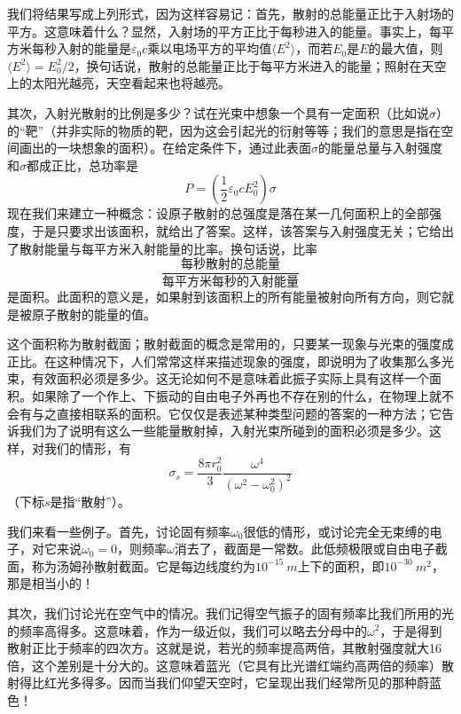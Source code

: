 我们将结果写成上列形式，因为这样容易记：首先，散射的总能量正比于入射场的平方。这意味着什么？显然，入射场的平方正比于每秒进入的能量。事实上，每平方米每秒入射的能量是$\varepsilon_0c$乘以电场平方的平均值$\langle E^2 \rangle$，而若$E_0$是$E$的最大值，则$\langle E^2 \rangle = E^2_0 / 2$，换句话说，散射的总能量正比于每平方米进入的能量；照射在天空上的太阳光越亮，天空看起来也将越亮。

其次，入射光散射的比例是多少？试在光束中想象一个具有一定面积（比如说$\sigma$）的“靶”（并非实际的物质的靶，因为这会引起光的衍射等等；我们的意思是指在空间画出的一块想象的面积）。在给定条件下，通过此表面$\sigma$的能量总量与入射强度和$\sigma$都成正比，总功率是
\begin{equation}
    \label{Eq:I:32:18}
    P = \left ( \frac{1}{2}\varepsilon_0cE^2_0 \right )\sigma
\end{equation}
现在我们来建立一种概念：设原子散射的总强度是落在某一几何面积上的全部强度，于是只要求出该面积，就给出了答案。这样，该答案与入射强度无关；它给出了散射能量与每平方米入射能量的比率。换句话说，比率
\begin{equation*}
    \frac{\text{每秒散射的总能量}}{\text{每平方米每秒的入射能量}}
\end{equation*}
是面积。此面积的意义是，如果射到该面积上的所有能量被射向所有方向，则它就是被原子散射的能量的值。

这个面积称为散射截面；散射截面的概念是常用的，只要某一现象与光束的强度成正比。在这种情况下，人们常常这样来描述现象的强度，即说明为了收集那么多光束，有效面积必须是多少。这无论如何不是意味着此振子实际上具有这样一个面积。如果除了一个作上、下振动的自由电子外再也不存在别的什么，在物理上就不会有与之直接相联系的面积。它仅仅是表述某种类型问题的答案的一种方法；它告诉我们为了说明有这么一些能量散射掉，入射光束所碰到的面积必须是多少。这样，对我们的情形，有
\begin{equation}
    \label{Eq:I:32:19}
    \sigma_s = \frac{8\pi r_0^2}{3} \frac{\omega^4}{(\omega^2 - \omega_0^2)^2}
\end{equation}
（下标$s$是指“散射”）。

我们来看一些例子。首先，讨论固有频率$\omega_0$很低的情形，或讨论完全无束缚的电子，对它来说$\omega_0=0$，则频率$\omega$消去了，截面是一常数。此低频极限或自由电子截面，称为汤姆孙散射截面。它是每边线度约为$10^{-15}~m$上下的面积，即$10^{-30}~m^2$，那是相当小的！

其次，我们讨论光在空气中的情况。我们记得空气振子的固有频率比我们所用的光的频率高得多。这意味着，作为一级近似，我们可以略去分母中的$\omega^2$，于是得到散射正比于频率的四次方。这就是说，若光的频率提高两倍，其散射强度就大16倍，这个差别是十分大的。这意味着蓝光（它具有比光谱红端约高两倍的频率）散射得比红光多得多。因而当我们仰望天空时，它呈现出我们经常所见的那种蔚蓝色！

